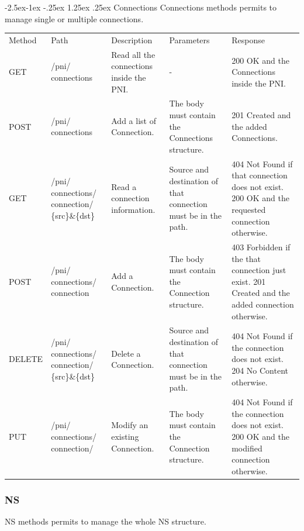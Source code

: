 \documentclass[11pt, english]{article}
\makeatletter
\renewcommand\paragraph{\@startsection{paragraph}{4}{\z@}%
            {-2.5ex\@plus -1ex \@minus -.25ex}%
            {1.25ex \@plus .25ex}%
            {\normalfont\normalsize\bfseries}}
\makeatother
\begin{document}
\newpage
\paragraph{Connections}
Connections methods permits to manage single or multiple connections. \\

\begin{tabular}{ |p{2cm}|m{3cm}|p{3cm}|p{3cm}|p{4cm}| }
    \hline
    \rowcolor{black} \multicolumn{5}{|c|}{\textcolor{white}{Connections}} \\
    \hline
    \rowcolor{Gray}
    Method & Path & Description & Parameters & Response \\
    \hline
    GET   & /pni/ connections & Read all the connections inside the PNI. & - & 200 OK and the Connections inside the PNI. \\
    \hline
    POST & /pni/ connections & Add a list of Connection. & The body must contain the Connections structure. & 201 Created and the added Connections. \\
    \hline
    GET & /pni/ connections/ connection/ \{src\}\&\{dst\} & Read a connection information. & Source and destination of that connection must be in the path. & 404 Not Found if that connection does not exist. 200 OK and the requested connection otherwise. \\
    \hline
    POST & /pni/ connections/ connection & Add a Connection. & The body must contain the Connection structure. & 403 Forbidden if the that connection just exist. 201 Created and the added connection otherwise. \\
    \hline
    DELETE & /pni/ connections/ connection/ \{src\}\&\{dst\} & Delete a Connection. & Source and destination of that connection must be in the path. & 404 Not Found if the connection does not exist. 204 No Content otherwise. \\
    \hline
    PUT & /pni/ connections/ connection/ & Modify an existing Connection. & The body must contain the Connection structure. & 404 Not Found if the connection does not exist. 200 OK and the modified connection otherwise. \\
    \hline
\end{tabular}

\newpage
\subsubsection{NS}
NS methods permits to manage the whole NS structure. \\
\end{document}
